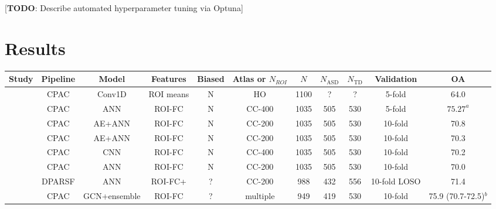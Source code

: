 \documentclass[10pt]{article}
\begin{document}
[\textbf{TODO}: Describe automated hyperparameter tuning via Optuna]


\section{Results}




\newpage
\begin{landscape}

\begin{table}
  \small
  \centering
  \begin{tabular}{lcccccccccc}
    \toprule
    Study                                                         & Pipeline & Model  & Features & Biased &Atlas or \(N_{ROI}\)  & \(N\) & \(N_\text{ASD}\) & \(N_{\text{TD}}\) & Validation & OA \\
    \midrule
    \citeauthor{el-gazzarHybrid3DCNN3DCLSTM2019}                       &   CPAC   & Conv1D & ROI means&   N    &     HO     & 1100  &   ?   &   ?   &   5-fold   &       64.0       \\
    \citeauthor{yangDeepNeuralNetwork2020}                             &   CPAC   &  ANN   &  ROI-FC  &   N    &   CC-400   & 1035  &  505  &  530  &   5-fold   &     \(75.27^a\)  \\
    \citeauthor{almuqhimASDSAENetSparseAutoencoder2021}                &   CPAC   & AE+ANN &  ROI-FC  &   N    &   CC-200   & 1035  &  505  &  530  &  10-fold   &       70.8       \\
    \citeauthor{eslamiASDDiagNetHybridLearning2019}                    &   CPAC   & AE+ANN &  ROI-FC  &   N    &   CC-200   & 1035  &  505  &  530  &  10-fold   &       70.3       \\
    \citeauthor{sherkatghanadAutomatedDetectionAutism2020}             &   CPAC   &  CNN   &  ROI-FC  &   N    &   CC-400   & 1035  &  505  &  530  &  10-fold   &       70.2       \\
    \citeauthor{heinsfeldIdentificationAutismSpectrum2018}             &   CPAC   &   ANN  &  ROI-FC  &   N    &   CC-200   & 1035  &  505  &  530  &  10-fold   &       70.0       \\
    \citeauthor{ingalhalikarFunctionalConnectivitybasedPrediction2021} &  DPARSF  &  ANN   &  ROI-FC+ &   ?    &   CC-200   &  988  &  432  &  556  &10-fold LOSO&       71.4       \\
    \citeauthor{wangMAGEAutomaticDiagnosis2021}                        &   CPAC   &GCN+ensemble&ROI-FC&   ?    &  multiple  &  949  &  419  &  530  &  10-fold   & 75.9 (70.7-72.5)\(^b\)  \\

\end{tabular}
\end{table}
\end{landscape}
\end{document}
